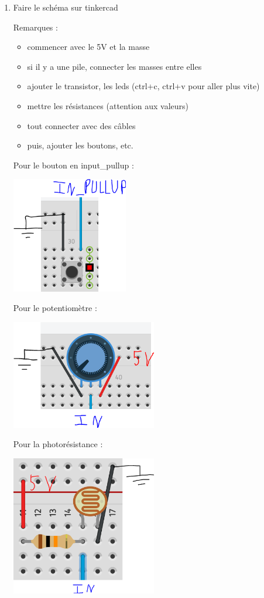 \documentclass[a4paper]{article}
\begin{document}
\begin{enumerate}
\item Faire le schéma sur tinkercad
\begin{example}
    Remarques :
    \begin{itemize}
        \item commencer avec le 5V et la masse
        \item si il y a une pile, connecter les masses entre elles
        \item ajouter le transistor, les leds (ctrl+c, ctrl+v pour aller plus vite)
        \item mettre les résistances (attention aux valeurs)
        \item tout connecter avec des câbles
        \item puis, ajouter les boutons, etc.
    \end{itemize}
    Pour le bouton en input\_pullup :
    \begin{center}
        \includegraphics[width=0.4\textwidth]{images/bouton-input-pullup.PNG}
    \end{center}
    Pour le potentiomètre :
    \begin{center}
        \includegraphics[width=0.5\textwidth]{images/potentiometre.PNG}
    \end{center}
    Pour la photorésistance :
    \begin{center}
        \includegraphics[width=0.5\textwidth]{images/photoresistance.PNG}
    \end{center}
\end{example}



\end{enumerate}
\end{document}
